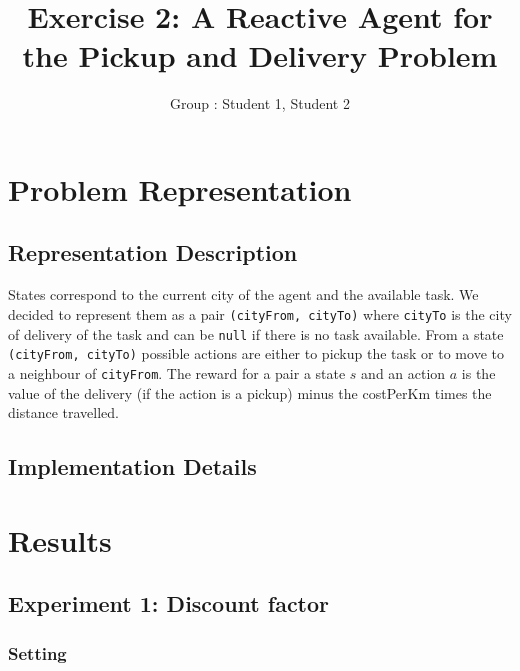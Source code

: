 \documentclass[11pt]{article}
\title{\bf Exercise 2: A Reactive Agent for the Pickup and Delivery Problem}
\author{Group \textnumero: Student 1, Student 2}
\begin{document}
\maketitle

\section{Problem Representation}

\subsection{Representation Description}

States correspond to the current city of the agent and the available task. We decided to represent them as a pair \verb|(cityFrom, cityTo)| where \verb|cityTo| is the city of delivery of the task and can be \verb|null| if there is no task available. From a state \verb|(cityFrom, cityTo)| possible actions are either to pickup the task or to move to a neighbour of \verb|cityFrom|. The reward for a pair a state $s$ and an action $a$ is the value of the delivery (if the action is a pickup) minus the costPerKm times the distance travelled.

\subsection{Implementation Details}

\section{Results}

\subsection{Experiment 1: Discount factor}

\subsubsection{Setting}
\end{document}
